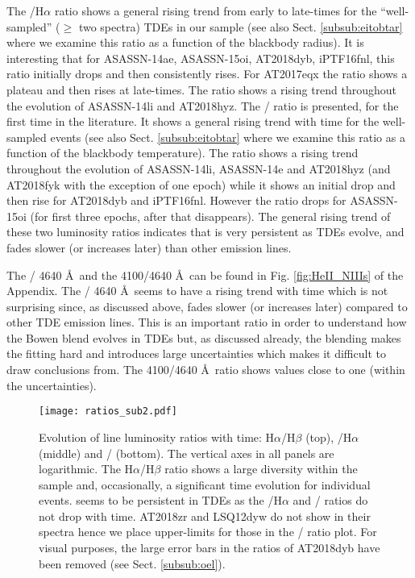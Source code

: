 \documentclass[structabstract]{aa}
\begin{document}
The /H$\alpha$ ratio shows a general rising trend from early to late-times for the ``well-sampled'' ($\geq$ two spectra) TDEs in our sample (see also Sect. \ref{subsub:eitobtar} where we examine this ratio as a function of the blackbody radius). It is interesting that for ASASSN-14ae, ASASSN-15oi, AT2018dyb, iPTF16fnl, this ratio initially drops and then consistently rises. For AT2017eqx the ratio shows a plateau and then rises at late-times. The ratio shows a rising trend throughout the evolution of ASASSN-14li and AT2018hyz.
The / ratio is presented, for the first time in the literature. It shows a general rising trend with time for the well-sampled events (see also Sect. \ref{subsub:eitobtar} where we examine this ratio as a function of the blackbody temperature). The ratio shows a rising trend throughout the evolution of ASASSN-14li, ASASSN-14e and AT2018hyz (and AT2018fyk with the exception of one epoch) while it shows an initial drop and then rise for AT2018dyb and iPTF16fnl. However the ratio drops for ASASSN-15oi (for first three epochs, after that  disappears). The general rising trend of these two luminosity ratios indicates that  is very persistent as TDEs evolve, and fades slower (or increases later) than other emission lines.

The / 4640 \AA\, and the  4100/4640 \AA\, can be found in Fig. \ref{fig:HeII_NIIIs} of the Appendix. 
The / 4640 \AA\, seems to have a rising trend with time which is not surprising since, as discussed above,  fades slower (or increases later) compared to other TDE emission lines. This is an important ratio in order to understand how the Bowen blend evolves in TDEs but, as discussed already, the blending makes the fitting hard and introduces large uncertainties which makes it difficult to draw conclusions from. The  4100/4640 \AA\, ratio shows values close to one (within the uncertainties).

\begin{figure}
\centering
\texttt{[image: ratios\_sub2.pdf]}
\caption{Evolution of line luminosity ratios with time: H$\alpha$/H$\beta$ (top), /H$\alpha$ (middle) and / (bottom). The vertical axes in all panels are logarithmic. The H$\alpha$/H$\beta$ ratio shows a large diversity within the sample and, occasionally, a significant time evolution for individual events.  seems to be persistent in TDEs as the /H$\alpha$ and / ratios do not drop with time. AT2018zr and LSQ12dyw do not show  in their spectra hence we place upper-limits for those in the / ratio plot. For visual purposes, the large error bars in the  ratios of AT2018dyb have been removed (see Sect. \ref{subsub:oel}).}
\label{fig:ratios}
\end{figure}
\end{document}
